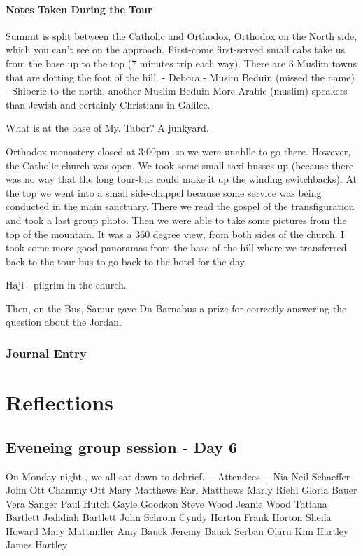 \documentclass[letterpaper]{report}
\begin{document}
\subsubsection{Notes Taken During the Tour}
Summit is split between the Catholic and Orthodox, Orthodox on the North side, which you can't see on the approach.
First-come first-served small cabs take us from the base up to the top (7 minutes trip each way).
There are 3 Muslim towns that are dotting the foot of the hill.
 - Debora
 - Musim Beduin (missed the name)
 - Shiberie to the north, another Muslim Beduin
More Arabic (muslim) speakers than Jewish and certainly Christians in Galilee.

What is at the base of My. Tabor?  A junkyard.

Orthodox monastery closed at 3:00pm, so we were unablle to go there. However, the Catholic church was open.
We took some small taxi-busses up (because there was no way that the long tour-bus could make it up the winding switchbacks). At the top we went into a small side-chappel because some service was being conducted in the main sanctuary.  There we read the gospel of the transfiguration and took a last group photo. 
Then we were able to take some pictures from the top of the mountain. It was a 360 degree view, from both sides of the church.
I took some more good panoramas from the base of the hill where we transferred back to the tour bus to go back to the hotel for the day.

Haji - pilgrim in the church.

Then, on the Bus, Samur gave Dn Barnabus a prize for correctly answering the question about the Jordan.

\clearpage
\subsection{Journal Entry}

\chapter{Reflections}
\section{Eveneing group session - Day 6}
On Monday night , we all sat down to debrief.
---Attendees---
Nia 
Neil Schaeffer
John Ott
Chammy Ott
Mary Matthews
Earl Matthews
Marly Riehl
Gloria Bauer
Vera Sanger
Paul Hutch
Gayle Goodson
Steve Wood
Jeanie Wood
Tatiana Bartlett
Jedidiah Bartlett
John Schrom
Cyndy Horton
Frank Horton
Sheila Howard
Mary Mattmiller
Amy Bauck
Jeremy Bauck
Serban Olaru
Kim Hartley
James Hartley
\end{document}
